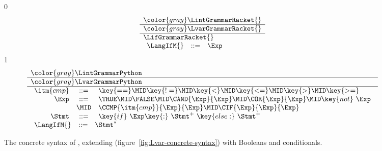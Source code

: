 \documentclass[7x10]{TimesAPriori_MIT}%
\newcommand{\gray}[1]{{\color{gray} #1}}
\def\racketEd{0}
\def\pythonEd{1}
\def\edition{0}
\numberwithin{theorem}{chapter}
\numberwithin{definition}{chapter}
\numberwithin{equation}{chapter}
\begin{document}
\newcommand{\LifGrammarPython}{
\begin{array}{rcl}
  \itm{cmp} &::= & \key{==} \MID \key{!=} \MID \key{<} \MID \key{<=} \MID \key{>} \MID \key{>=} \\
\Exp &::=& \TRUE \MID \FALSE \MID \CAND{\Exp}{\Exp} \MID \COR{\Exp}{\Exp}
  \MID \key{not}~\Exp \\
  &\MID& \CCMP{\itm{cmp}}{\Exp}{\Exp}
  \MID \CIF{\Exp}{\Exp}{\Exp} \\
  \Stmt &::=& \key{if}~ \Exp \key{:}~ \Stmt^{+} ~\key{else:}~ \Stmt^{+}
\end{array}
}
\newcommand{\LifASTPython}{
\begin{array}{lcl}
\itm{boolop} &::=& \code{And()} \MID \code{Or()} \\
\itm{unaryop} &::=& \code{Not()} \\
\itm{cmp} &::= & \code{Eq()} \MID \code{NotEq()} \MID \code{Lt()} \MID \code{LtE()} \MID \code{Gt()} \MID \code{GtE()} \\
\itm{bool} &::=& \code{True} \MID \code{False} \\
\Exp &::=& \BOOL{\itm{bool}} 
     \MID \BOOLOP{\itm{boolop}}{\Exp}{\Exp}\\
     &\MID& \CMP{\Exp}{\itm{cmp}}{\Exp}  \MID \IF{\Exp}{\Exp}{\Exp} \\
\Stmt{} &::=& \IFSTMT{\Exp}{\Stmt^{+}}{\Stmt^{+}}
\end{array}
}


\begin{figure}[tp]
\centering
\begin{tcolorbox}[colback=white]
{\if\edition\racketEd    
\[
\begin{array}{l}
  \gray{\LintGrammarRacket{}} \\ \hline
  \gray{\LvarGrammarRacket{}} \\ \hline
  \LifGrammarRacket{} \\ 
  \begin{array}{lcl}
    \LangIfM{} &::=& \Exp
  \end{array}
\end{array}
\]
\fi}
{\if\edition\pythonEd
\[
\begin{array}{l}
  \gray{\LintGrammarPython} \\ \hline
  \gray{\LvarGrammarPython}  \\ \hline
  \LifGrammarPython \\  
\begin{array}{rcl}
  \LangIfM{} &::=& \Stmt^{*}
\end{array}
\end{array}
\]
\fi}
\end{tcolorbox}
\caption{The concrete syntax of \LangIf{}, extending \LangVar{}
  (figure~\ref{fig:Lvar-concrete-syntax}) with Booleans and conditionals.}
\label{fig:Lif-concrete-syntax}
\end{figure}
\end{document}
